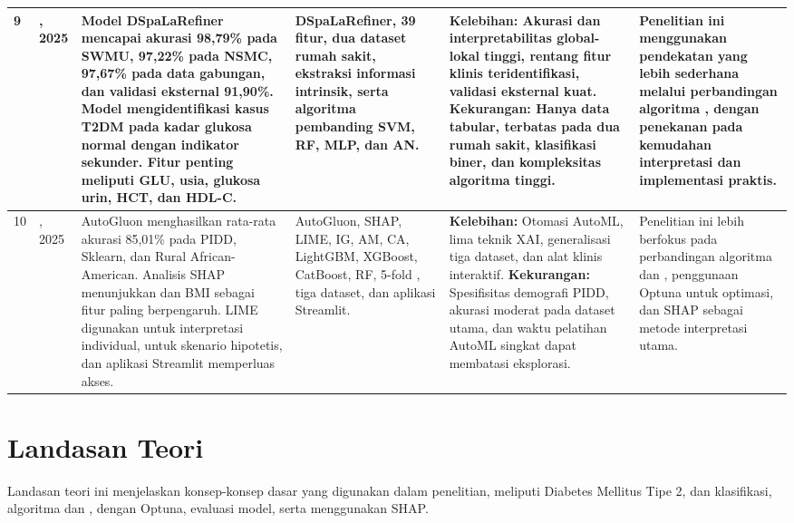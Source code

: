\begin{landscape}
\begin{longtable}{|C{0.7cm}|L{2.9cm}|L{5.4cm}|L{3.0cm}|L{4.4cm}|L{3.7cm}|}
9 & , 2025 \cite{ref30} & Model DSpaLaRefiner mencapai akurasi 98,79\% pada SWMU, 97,22\% pada NSMC, 97,67\% pada data gabungan, dan validasi eksternal 91,90\%. Model mengidentifikasi kasus T2DM pada kadar glukosa normal dengan indikator sekunder. Fitur penting meliputi GLU, usia, glukosa urin, HCT, dan HDL-C. & DSpaLaRefiner, 39 fitur, dua dataset rumah sakit, ekstraksi informasi intrinsik, serta algoritma pembanding SVM, RF, MLP, dan AN. & \textbf{Kelebihan:} Akurasi dan interpretabilitas global-lokal tinggi, rentang fitur klinis teridentifikasi, validasi eksternal kuat. \newline\textbf{Kekurangan:} Hanya data tabular, terbatas pada dua rumah sakit, klasifikasi biner, dan kompleksitas algoritma tinggi. & Penelitian ini menggunakan pendekatan yang lebih sederhana melalui perbandingan algoritma , dengan penekanan pada kemudahan interpretasi dan implementasi praktis.\\ \hline

10 & , 2025 \cite{ref15} & AutoGluon menghasilkan rata-rata akurasi 85,01\% pada PIDD, Sklearn, dan Rural African-American. Analisis SHAP menunjukkan  dan BMI sebagai fitur paling berpengaruh. LIME digunakan untuk interpretasi individual,  untuk skenario hipotetis, dan aplikasi Streamlit memperluas akses. & AutoGluon, SHAP, LIME, IG, AM, CA, LightGBM, XGBoost, CatBoost, RF, 5-fold , tiga dataset, dan aplikasi Streamlit. & \textbf{Kelebihan:} Otomasi AutoML, lima teknik XAI, generalisasi tiga dataset, dan alat klinis interaktif. \newline\textbf{Kekurangan:} Spesifisitas demografi PIDD, akurasi moderat pada dataset utama, dan waktu pelatihan AutoML singkat dapat membatasi eksplorasi. & Penelitian ini lebih berfokus pada perbandingan algoritma  dan , penggunaan Optuna untuk optimasi, dan SHAP sebagai metode interpretasi utama.\\ \hline
\end{longtable}
\setlength{\tabcolsep}{6pt}
\end{landscape}

\section{Landasan Teori}
Landasan teori ini menjelaskan konsep-konsep dasar yang digunakan dalam penelitian, meliputi Diabetes Mellitus Tipe 2,  dan klasifikasi, algoritma  dan ,  dengan Optuna, evaluasi model, serta  menggunakan SHAP.

